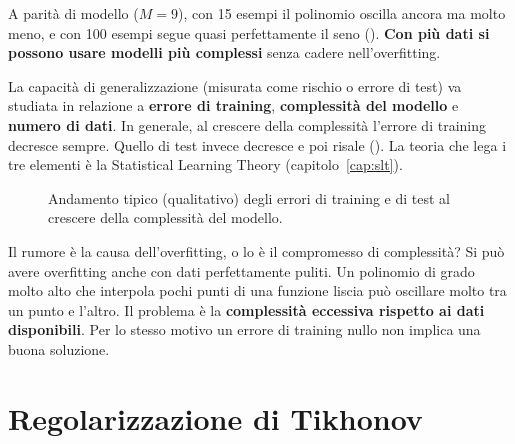 A parità di modello ($M=9$), con 15 esempi il polinomio oscilla ancora ma molto meno, e con 100 esempi segue
quasi perfettamente il seno (). \textbf{Con più dati si possono usare modelli più
complessi} senza cadere nell'overfitting.

\begin{idea}
La capacità di generalizzazione (misurata come rischio o errore di test) va studiata in relazione a
\textbf{errore di training}, \textbf{complessità del modello} e \textbf{numero di dati}. In generale, al crescere
della complessità l'errore di training decresce sempre. Quello di test invece decresce e poi risale
(). La teoria che lega i tre elementi è la Statistical Learning Theory
(capitolo~\ref{cap:slt}).
\end{idea}

\begin{figure}[ht]
\centering
{}
\caption{Andamento tipico (qualitativo) degli errori di training e di test al crescere della complessità del
modello.}
\label{fig:curva-complessita}
\end{figure}

\begin{esempio}
Il rumore è la causa dell'overfitting, o lo è il compromesso di complessità? Si può avere overfitting anche con
dati perfettamente puliti. Un polinomio di grado molto alto che interpola pochi punti di una funzione liscia può
oscillare molto tra un punto e l'altro. Il problema è la \textbf{complessità eccessiva rispetto ai dati
disponibili}. Per lo stesso motivo un errore di training nullo non implica una buona soluzione.
\end{esempio}

\section{Regolarizzazione di Tikhonov}
\label{sec:tikhonov}

